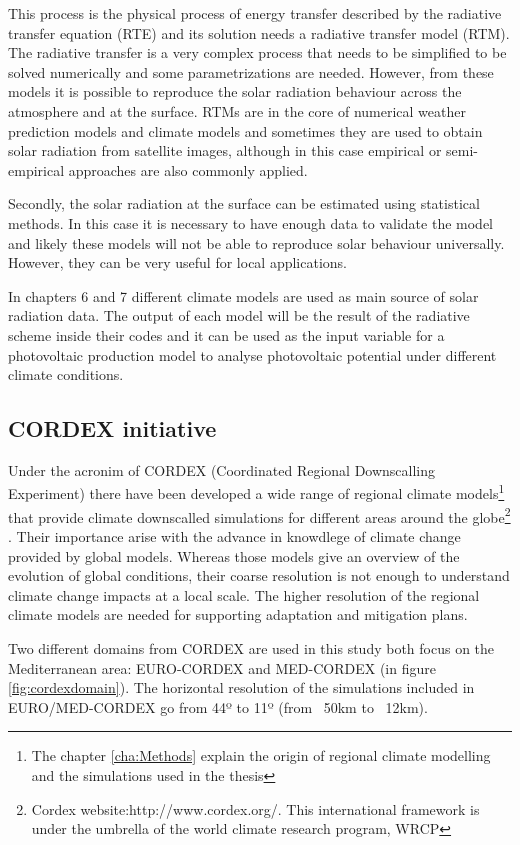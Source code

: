 This process is the physical process of energy transfer described by the radiative transfer equation (RTE) and its solution needs a radiative transfer model (RTM). The radiative transfer is a very complex process that needs to be simplified to be solved numerically and some parametrizations are needed. However, from these models it is possible to reproduce the solar radiation behaviour across the atmosphere and at the surface. RTMs are in the core of numerical weather prediction models and climate models and sometimes they are used to obtain solar radiation from satellite images, although in this case empirical or semi-empirical approaches are also commonly applied.

Secondly, the solar radiation at the surface can be estimated using statistical methods. In this case it is necessary to have enough data to validate the model and likely these models will not be able to reproduce solar behaviour universally. However, they can be very useful for local applications.

In chapters 6 and 7 different climate models are used as main source of solar radiation data. The output of each model will be the result of the radiative scheme inside their codes and it can be used as the input variable for a photovoltaic production model to analyse photovoltaic potential under different climate conditions.

\subsection{CORDEX initiative}

Under the acronim of CORDEX (Coordinated Regional Downscalling Experiment) there have been developed a wide range of regional climate models\footnote{The chapter \ref{cha:Methods} explain the origin of regional climate modelling and the simulations used in the thesis} that provide climate downscalled simulations for different areas around the globe\footnote{Cordex website:http://www.cordex.org/. This international framework is under the umbrella of the world climate research program, WRCP} . Their importance arise with the advance in knowdlege of climate change provided by global models. Whereas those models give an overview of the evolution of global conditions, their coarse resolution is not enough to understand climate change impacts at a local scale. The higher resolution of the regional climate models are needed for supporting adaptation and mitigation plans.

Two different domains from CORDEX are used in this study both focus on the Mediterranean area: EURO-CORDEX and MED-CORDEX (in figure \ref{fig:cordexdomain}). The horizontal resolution of the simulations included in EURO/MED-CORDEX go from 44º to 11º (from ~50km to ~12km).

